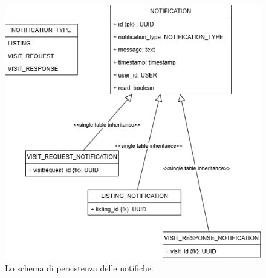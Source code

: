 \begin{figure}[h]
    \centering
    \includegraphics[width=\textwidth]{assets/diagrams/db-scheme/notification.png}
    \caption{Lo schema di persistenza delle notifiche.}
    \label{fig:Schema di persistenza delle notifiche}
\end{figure}

